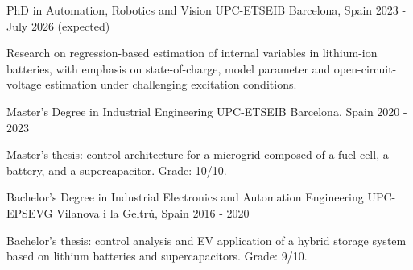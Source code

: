 

\begin{cventries}

  \cventry
    {PhD in Automation, Robotics and Vision}
    {UPC-ETSEIB}
    {Barcelona, Spain}
    {2023 - July 2026 (expected)}
    {
      \begin{cvitems}
        \item {Research on regression-based estimation of internal variables in lithium-ion batteries, with emphasis on state-of-charge, model parameter and open-circuit-voltage estimation under challenging excitation conditions.}
      \end{cvitems}
    }

  \cventry
    {Master's Degree in Industrial Engineering}
    {UPC-ETSEIB}
    {Barcelona, Spain}
    {2020 - 2023}
    {
      \begin{cvitems}
        \item {Master's thesis: control architecture for a microgrid composed of a fuel cell, a battery, and a supercapacitor. Grade: 10/10.}
      \end{cvitems}
    }

  \cventry
    {Bachelor's Degree in Industrial Electronics and Automation Engineering}
    {UPC-EPSEVG}
    {Vilanova i la Geltr\'u, Spain}
    {2016 - 2020}
    {
      \begin{cvitems}
        \item {Bachelor's thesis: control analysis and EV application of a hybrid storage system based on lithium batteries and supercapacitors. Grade: 9/10.}
      \end{cvitems}
    }

\end{cventries}
